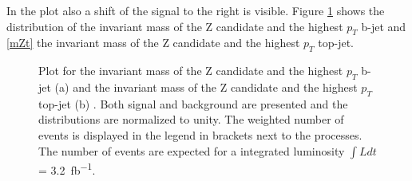 In the plot also a shift of the signal to the right is visible.
Figure \ref{mZb+mZt} shows the distribution of the invariant mass of the Z candidate and the highest $p_{T}$ b-jet and \ref{mZt} the invariant mass of the Z candidate and the highest $p_{T}$ top-jet.


\begin{figure}[h]
    \centering
    \caption{Plot for the invariant mass of the Z candidate and the highest $p_{T}$ b-jet (a) and the invariant mass of the Z candidate and the highest $p_{T}$ top-jet (b)  . 
Both signal and background are presented and the distributions are normalized to unity. 
The weighted number of events is displayed in the legend in brackets next to the processes. 
The number of events are expected for a integrated luminosity $\int L dt$ = \SI{3.2}{fb^{-1}}.}
    \label{mZb+mZt}   
\end{figure}
